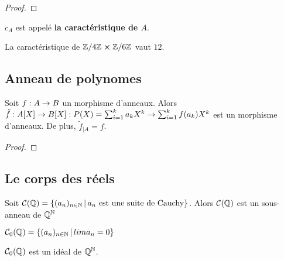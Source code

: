 \ifdefined\outputproof
\begin{proof}

\end{proof}
\fi

\begin{definition}
	$c_{A}$ est appelé \textbf{la caractéristique de $A$}.
\end{definition}

\begin{exemple}
	La caractéristique de $\mathbb{Z}/4\mathbb{Z} \cross \mathbb{Z}/6\mathbb{Z}$ vaut
	$12$.
\end{exemple}

\subsection{Anneau de polynomes}

\begin{proposition}
	Soit $f : A \rightarrow B$ un morphisme d'anneaux. Alors
	$\tilde{f} : A[X] \rightarrow B[X] : P(X) = \sum_{i = 1}^{k} a_{k} X^{k}
	\rightarrow \sum_{i = 1}^{k} f(a_{k}) X^{k}$ est un morphisme d'anneaux. De
	plus, $\tilde{f}_{|A} = f$.
\end{proposition}

\ifdefined\outputproof
\begin{proof}

\end{proof}
\fi


\subsection{Le corps des réels}

\begin{proposition}
	Soit $\mathcal{C}(\mathbb{Q}) =
	\left\{(a_{n})_{n \in \mathbb{N}} \, | \, a_{n} \text{ est une suite de Cauchy} \right\}$.
	Alors $\mathcal{C}(\mathbb{Q})$ est un sous-anneau de $\mathbb{Q}^{\mathbb{N}}$
\end{proposition}

\begin{definition}
	$\mathcal{C}_{0}(\mathbb{Q}) = \left\{(a_{n})_{n \in \mathbb{N}} \, | \, lim
		a_{n} = 0 \right\}$
\end{definition}

\begin{proposition}
	$\mathcal{C}_{0}(\mathbb{Q})$ est un idéal de $\mathbb{Q}^{\mathbb{N}}$.
\end{proposition}

